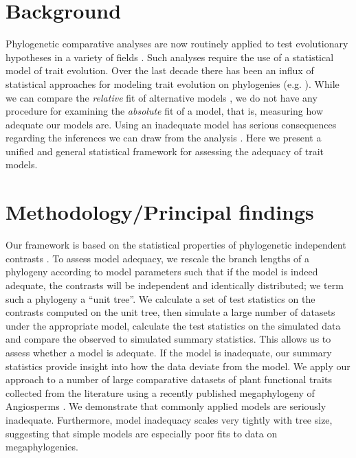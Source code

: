 \documentclass[a4paper,12pt]{article}
\begin{document}

\section*{Background}

Phylogenetic comparative analyses are now routinely applied to test evolutionary hypotheses in a variety of fields \citep{PennellHarmon}. Such analyses require the use of a statistical model of trait evolution. Over the last decade there has been an influx of statistical approaches for modeling trait evolution on phylogenies (e.g. \citep{ButlerKing2004, Omeara2006, Eastman2011, Beaulieu2012}). While we can compare the \textit{relative} fit of alternative models \citep{Harmon2010}, we do not have any procedure for examining the \textit{absolute} fit of a model, that is, measuring how adequate our models are. Using an inadequate model has serious consequences regarding the inferences we can draw from the analysis \citep{Boettiger2012, SlaterPennell}. Here we present a unified and general statistical framework for assessing the adequacy of trait models.

\section*{Methodology/Principal findings}

Our framework is based on the statistical properties of phylogenetic independent contrasts \citep{Felsenstein1985}. To assess model adequacy, we rescale the branch lengths of a phylogeny according to model parameters such that if the model is indeed adequate, the contrasts will be independent and identically distributed; we term such a phylogeny a ``unit tree''. We calculate a set of test statistics on the contrasts computed on the unit tree, then simulate a large number of datasets under the appropriate model, calculate the test statistics on the simulated data and compare the observed to simulated summary statistics. This allows us to assess whether a model is adequate. If the model is inadequate, our summary statistics provide insight into how the data deviate from the model. We apply our approach to a number of large comparative datasets of plant functional traits collected from the literature using a recently published megaphylogeny of Angiosperms \citep{Zanne2013}. We demonstrate that commonly applied models are seriously inadequate. Furthermore, model inadequacy scales very tightly with tree size, suggesting that simple models are especially poor fits to data on megaphylogenies.
\end{document}

